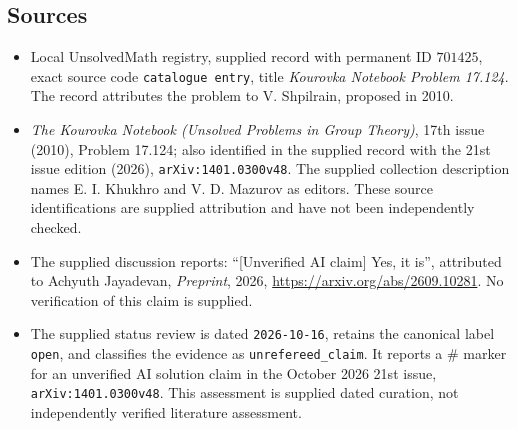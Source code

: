 \documentclass[11pt]{article}
\begin{document}
\subsection{Sources}
\begin{itemize}
\item Local UnsolvedMath registry, supplied record with permanent ID \(701425\), exact source code \texttt{catalogue entry}, title \emph{Kourovka Notebook Problem 17.124}. The record attributes the problem to V. Shpilrain, proposed in 2010.
\item \emph{The Kourovka Notebook (Unsolved Problems in Group Theory)}, 17th issue (2010), Problem 17.124; also identified in the supplied record with the 21st issue edition (2026), \texttt{arXiv:1401.0300v48}. The supplied collection description names E. I. Khukhro and V. D. Mazurov as editors. These source identifications are supplied attribution and have not been independently checked.
\item The supplied discussion reports: ``[Unverified AI claim] Yes, it is'', attributed to Achyuth Jayadevan, \emph{Preprint}, 2026, \url{https://arxiv.org/abs/2609.10281}. No verification of this claim is supplied.
\item The supplied status review is dated \texttt{2026-10-16}, retains the canonical label \texttt{open}, and classifies the evidence as \texttt{unrefereed\_claim}. It reports a \(\#\) marker for an unverified AI solution claim in the October 2026 21st issue, \texttt{arXiv:1401.0300v48}. This assessment is supplied dated curation, not independently verified literature assessment.
\end{itemize}
\end{document}
